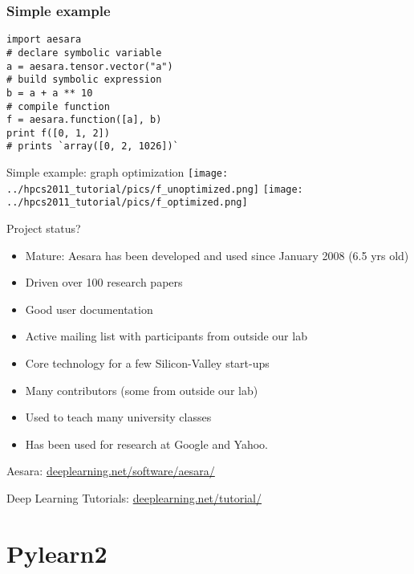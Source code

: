 \documentclass[utf8x,xcolor=pdftex,dvipsnames,table]{beamer}
\begin{document}
\begin{frame}[fragile]
  \frametitle{Simple example}

\begin{lstlisting}
import aesara
# declare symbolic variable
a = aesara.tensor.vector("a")
# build symbolic expression
b = a + a ** 10
# compile function
f = aesara.function([a], b)
print f([0, 1, 2])
# prints `array([0, 2, 1026])`
\end{lstlisting}
\end{frame}

\begin{frame}{Simple example: graph optimization}
\center
\texttt{[image: ../hpcs2011\_tutorial/pics/f\_unoptimized.png]}
\hspace{0.1\textwidth}
\texttt{[image: ../hpcs2011\_tutorial/pics/f\_optimized.png]}

\end{frame}


\begin{frame}{Project status?}
  \begin{itemize}
    \item Mature: Aesara has been developed and used since January 2008 (6.5 yrs old)
    \item Driven over 100 research papers
    \item Good user documentation
    \item Active mailing list with participants from outside our lab
    \item Core technology for a few Silicon-Valley start-ups
    \item Many contributors (some from outside our lab)
    \item Used to teach many university classes
    \item Has been used for research at Google and Yahoo.
  \end{itemize}
  Aesara: \url{deeplearning.net/software/aesara/}

  Deep Learning Tutorials: \url{deeplearning.net/tutorial/}
\end{frame}


\section{Pylearn2}
\begin{frame}
  \tableofcontents[currentsection]
\end{frame}
\end{document}
